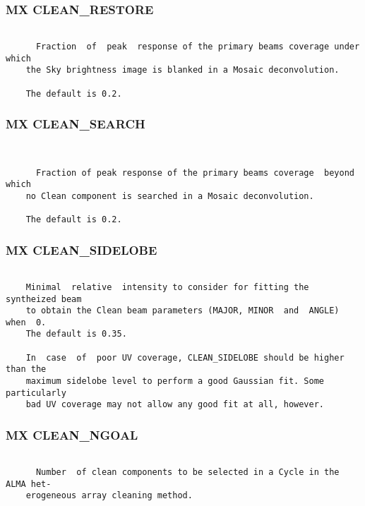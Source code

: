 \subsubsection{MX CLEAN\_RESTORE}
\begin{verbatim}

      Fraction  of  peak  response of the primary beams coverage under which
    the Sky brightness image is blanked in a Mosaic deconvolution.

    The default is 0.2.

\end{verbatim}
\subsubsection{MX CLEAN\_SEARCH}
\begin{verbatim}


      Fraction of peak response of the primary beams coverage  beyond  which
    no Clean component is searched in a Mosaic deconvolution.

    The default is 0.2.

\end{verbatim}
\subsubsection{MX CLEAN\_SIDELOBE}
\begin{verbatim}

    Minimal  relative  intensity to consider for fitting the syntheized beam
    to obtain the Clean beam parameters (MAJOR, MINOR  and  ANGLE)  when  0.
    The default is 0.35.

    In  case  of  poor UV coverage, CLEAN_SIDELOBE should be higher than the
    maximum sidelobe level to perform a good Gaussian fit. Some particularly
    bad UV coverage may not allow any good fit at all, however.

\end{verbatim}
\subsubsection{MX CLEAN\_NGOAL}
\begin{verbatim}

      Number  of clean components to be selected in a Cycle in the ALMA het-
    erogeneous array cleaning method.

\end{verbatim}
